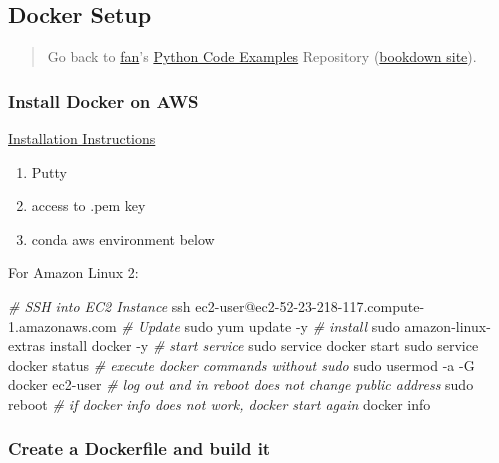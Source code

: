\documentclass[
]{book}
\newenvironment{Shaded}{\begin{snugshade}}{\end{snugshade}}
\newcommand{\CommentTok}[1]{\textcolor[rgb]{0.56,0.35,0.01}{\textit{#1}}}
\newcommand{\ExtensionTok}[1]{#1}
\newcommand{\FunctionTok}[1]{\textcolor[rgb]{0.00,0.00,0.00}{#1}}
\newcommand{\NormalTok}[1]{#1}
\providecommand{\tightlist}{%
  \setlength{\itemsep}{0pt}\setlength{\parskip}{0pt}}
\begin{document}
\hypertarget{docker-setup-1}{%
\subsection{Docker Setup}\label{docker-setup-1}}

\begin{quote}
Go back to \href{http://fanwangecon.github.io/}{fan}'s \href{https://fanwangecon.github.io/pyfan/}{Python Code Examples} Repository (\href{https://fanwangecon.github.io/pyfan/bookdown}{bookdown site}).
\end{quote}

\hypertarget{install-docker-on-aws}{%
\subsubsection{Install Docker on AWS}\label{install-docker-on-aws}}

\href{https://docs.aws.amazon.com/AmazonECS/latest/developerguide/docker-basics.html}{Installation Instructions}

\begin{enumerate}
\def\labelenumi{\arabic{enumi}.}
\tightlist
\item
  Putty
\item
  access to .pem key
\item
  conda aws environment below
\end{enumerate}

For Amazon Linux 2:

\begin{Shaded}
\begin{Highlighting}[]
\CommentTok{\# SSH into EC2 Instance}
\FunctionTok{ssh}\NormalTok{ ec2{-}user@ec2{-}52{-}23{-}218{-}117.compute{-}1.amazonaws.com}
\CommentTok{\# Update}
\FunctionTok{sudo}\NormalTok{ yum update {-}y}
\CommentTok{\# install}
\FunctionTok{sudo}\NormalTok{ amazon{-}linux{-}extras install docker {-}y}
\CommentTok{\# start service}
\FunctionTok{sudo}\NormalTok{ service docker start}
\FunctionTok{sudo}\NormalTok{ service docker status}
\CommentTok{\# execute docker commands without sudo}
\FunctionTok{sudo}\NormalTok{ usermod {-}a {-}G docker ec2{-}user}
\CommentTok{\# log out and in reboot does not change public address}
\FunctionTok{sudo}\NormalTok{ reboot}
\CommentTok{\# if docker info does not work, docker start again}
\ExtensionTok{docker}\NormalTok{ info}
\end{Highlighting}
\end{Shaded}

\hypertarget{create-a-dockerfile-and-build-it}{%
\subsubsection{Create a Dockerfile and build it}\label{create-a-dockerfile-and-build-it}}
\end{document}
